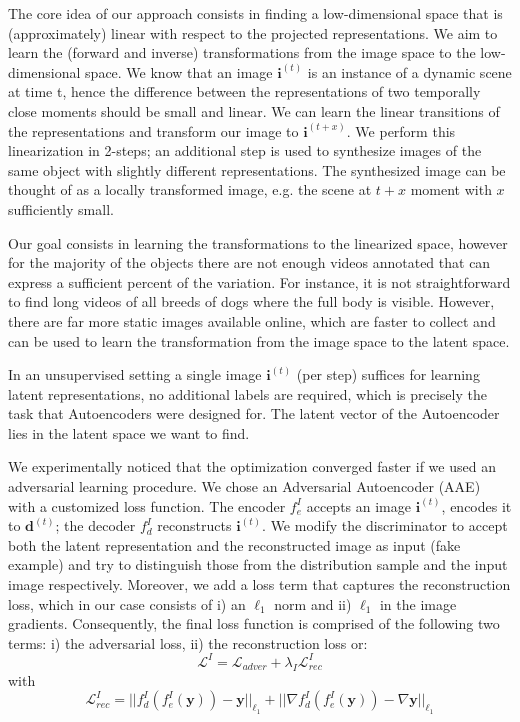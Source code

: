 \documentclass[10pt,twocolumn,letterpaper]{article}
\begin{document}
The core idea of our approach consists in finding a low-dimensional space that is (approximately)  linear with respect to the projected representations. We aim to learn the (forward and inverse) transformations from the image space to the low-dimensional space. We know that an image $\bm{i}^{(t)}$ is an instance of a dynamic scene at time t, hence the difference between the representations of two temporally close moments should be small and linear. We can learn the linear transitions of the representations and transform our image to $\bm{i}^{(t + x)}$. We perform this linearization in 2-steps; an additional step is used to synthesize images of the same object with slightly different representations. The synthesized image can be thought of as a locally transformed image, e.g. the scene at $t + x$ moment with $x$ sufficiently small. 

Our goal consists in learning the transformations to the linearized space, however for the majority of the objects there are not enough videos annotated that can express a sufficient percent of the variation. For instance, it is not straightforward to find long videos of all breeds of dogs where the full body is visible. However, there are far more static images available online, which are faster to collect and can be used to learn the transformation from the image space to the latent space. 


In an unsupervised setting a single image $\bm{i}^{(t)}$ (per step) suffices for learning latent representations, no additional labels are required, which is precisely the task that Autoencoders were designed for. The latent vector of the Autoencoder lies in the latent space we want to find.

We experimentally noticed that the optimization converged faster if we used an adversarial learning procedure. We chose an Adversarial Autoencoder (AAE)~\cite{makhzani2015adversarial} with a customized loss function. The encoder $f_e^{I}$ accepts an image $\bm{i}^{(t)}$, encodes it to $\bm{d}^{(t)}$; the decoder $f_d^{I}$ reconstructs $\bm{i}^{(t)}$. We modify the discriminator to accept both the latent representation and the reconstructed image as input (fake example) and try to distinguish those from the distribution sample and the input image respectively. Moreover, we add a loss term that captures the reconstruction loss, which in our case consists of i) an $\ell_1$ norm and ii) $\ell_1$ in the image gradients.
Consequently, the final loss function is comprised of the following two terms: i) the adversarial loss, ii) the reconstruction loss or:
\begin{equation}
    \mathcal{L}^{I} = \mathcal{L}_{adver} + \lambda_{I} \mathcal{L}_{rec}^{I}
\end{equation}
with
\begin{equation}
    \mathcal{L}_{rec}^{I} = ||f_d^{I}(f_e^{I}(\bm{y})) - \bm{y}||_{\ell_1} + ||\nabla f_d^{I}(f_e^{I}(\bm{y})) - \nabla \bm{y}||_{\ell_1}
    \label{eq:linear_dynamics_stageI_recloss}
\end{equation}
\end{document}
